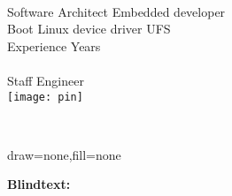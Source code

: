 \documentclass[a4paper]{chirri} %
\newcommand*{\localLocPin}{%
  \texttt{[image: pin]}%
}
\newcommand{\BAspaceBullet}{\space{\textbullet}\space}
\begin{document}

%
\begin{headingbox}[]
   \UserName{} \\
   Software Architect \BAspaceBullet Embedded developer \\
   \BAspaceBullet Boot \BAspaceBullet Linux device driver \BAspaceBullet UFS  \\
   Experience \UserExperience{} Years    \\
   \faPhone{} \UserMobile{} \BAspaceBullet \space \faEnvelope{} \space \UserEmailID{}
%
%
\tcblower
   \CurrentCompany{} \\
   Staff Engineer  \\
   {\Large{\localLocPin}}{} \UserLocation{}
%
%
\end{headingbox}
\\[0.25\baselineskip]

%
\begin{masterbox}{}{draw=none,fill=none}

\end{masterbox}

\lipsum[1-3]
\textbf{Blindtext:}
\Blindtext
\end{document}
